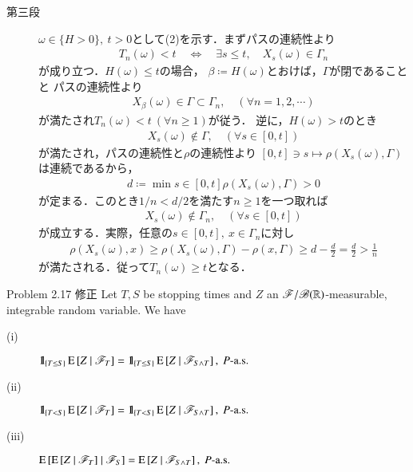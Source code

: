 \begin{prf}
\begin{description}
			\item[第三段]
				$\omega \in \{H>0\},\ t > 0$として(2)を示す．まずパスの連続性より
				\begin{align}
					T_n(\omega) < t \quad \Leftrightarrow \quad
					\exists s \leq t, \quad X_s(\omega) \in \Gamma_n
				\end{align}
				が成り立つ．$H(\omega) \leq t$の場合，
				$\beta \coloneqq H(\omega)$とおけば，$\Gamma$が閉であることと
				パスの連続性より
				\begin{align}
					X_\beta(\omega) \in \Gamma \subset \Gamma_n,
					\quad (\forall n=1,2,\cdots)
				\end{align}
				が満たされ$T_n(\omega) < t\ (\forall n \geq 1)$が従う．
				逆に，$H(\omega) > t$のとき
				\begin{align}
					X_s(\omega) \notin \Gamma,
					\quad (\forall s \in [0,t])
				\end{align}
				が満たされ，パスの連続性と$\rho$の連続性より
				$[0,t] \ni s \longmapsto \rho(X_s(\omega),\Gamma)$
				は連続であるから，
				\begin{align}
					d \coloneqq \min{s \in [0,t]}{\rho(X_s(\omega),\Gamma)} > 0
				\end{align}
				が定まる．このとき$1/n < d/2$を満たす$n \geq 1$を一つ取れば
				\begin{align}
					X_s(\omega) \notin \Gamma_n,
					\quad (\forall s \in [0,t])
				\end{align}
				が成立する．実際，任意の$s \in [0,t],\ x \in \Gamma_n$に対し
				\begin{align}
					\rho(X_s(\omega),x)
					\geq \rho(X_s(\omega),\Gamma) - \rho(x,\Gamma)
					\geq d - \frac{d}{2}
					= \frac{d}{2}
					> \frac{1}{n}
				\end{align}
				が満たされる．従って$T_n(\omega) \geq t$となる．
				\QED
		\end{description}
	\end{prf}
	
	\begin{itembox}[l]{Problem 2.17 修正}
		Let $T,S$ be stopping times and $Z$ an $\mathscr{F}/\mathscr{B}(\mathbb{R})$-measurable, 
		integrable random variable. We have
		\begin{description}
			\item[(i)] $\mbox{1}\hspace{-0.25em}\mbox{l}_{\{T \leq S\}} \operatorname{E} \left[ Z \ \middle|\ \mathscr{F}_T \right] = \mbox{1}\hspace{-0.25em}\mbox{l}_{\{T \leq S\}} \operatorname{E} \left[ Z \ \middle|\ \mathscr{F}_{S \wedge T} \right],\ \mbox{$P$-a.s.}$
			\item[(ii)] $\mbox{1}\hspace{-0.25em}\mbox{l}_{\{T < S\}} \operatorname{E} \left[ Z \ \middle|\ \mathscr{F}_T \right] = \mbox{1}\hspace{-0.25em}\mbox{l}_{\{T < S\}} \operatorname{E} \left[ Z \ \middle|\ \mathscr{F}_{S \wedge T} \right],\ \mbox{$P$-a.s.}$
			\item[(iii)] $\operatorname{E} \left[ \operatorname{E} \left[ Z \ \middle|\ \mathscr{F}_T \right] \ \middle|\ \mathscr{F}_S \right] = \operatorname{E} \left[ Z \ \middle|\ \mathscr{F}_{S \wedge T} \right],\ \mbox{$P$-a.s.}$
		\end{description}
	\end{itembox}
	
